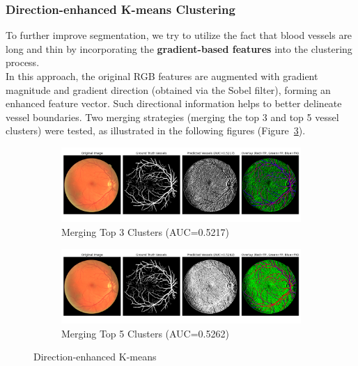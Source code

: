 \documentclass[12pt,letterpaper]{article}
\begin{document}
\subsubsection{Direction-enhanced K-means Clustering}
To further improve segmentation, we try to utilize the fact that blood vessels are long and thin by incorporating the \textbf{gradient-based features} into the clustering process. \\
In this approach, the original RGB features are augmented with gradient magnitude and gradient direction (obtained via the Sobel filter), forming an enhanced feature vector. Such directional information helps to better delineate vessel boundaries. Two merging strategies (merging the top 3 and top 5 vessel clusters) were tested, as illustrated in the following figures (Figure~\ref{fig:de}).
\begin{figure}[H]
    \centering
    \begin{subfigure}[H]{\textwidth}
        \centering
        \includegraphics[scale=0.35]{Figures/5 Directed (Merge 3 Clusters).png}
        \vspace{-0.5cm}
        \caption{Merging Top 3 Clusters (AUC=0.5217)}
        \label{fig:de3}
    \end{subfigure}
    \begin{subfigure}[H]{\textwidth}
        \centering
        \includegraphics[scale=0.35]{Figures/5 Directed (Merge 5 Clusters).png}
        \vspace{-0.5cm}
        \caption{Merging Top 5 Clusters (AUC=0.5262)}
        \label{fig:de5}
    \end{subfigure}
    \caption{Direction-enhanced K-means}
    \label{fig:de}
\end{figure}
\end{document}
